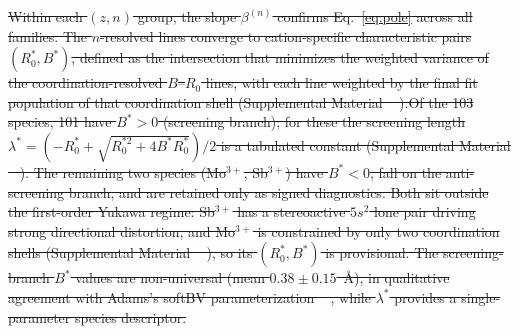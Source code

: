 \documentclass[aps,prmaterials,twocolumn,10pt,superscriptaddress,floatfix]{revtex4-2} %
\providecommand{\DIFdeltex}[1]{{\protect\color{red}\sout{#1}}}                      %
\providecommand{\DIFdelbegin}{} %
\providecommand{\DIFdel}[1]{\texorpdfstring{\DIFdeltex{#1}}{}} %
\newcommand{\DIFscaledelfig}{0.5}
\newlength{\DIFdelgraphicswidth} %
\newlength{\DIFdelgraphicsheight} %
\newcommand{\DIFdelincludegraphics}[2][]{%
\sbox{\DIFdelgraphicsbox}{\DIFOincludegraphics[#1]{#2}}%
\settoboxwidth{\DIFdelgraphicswidth}{\DIFdelgraphicsbox} %
\settoboxtotalheight{\DIFdelgraphicsheight}{\DIFdelgraphicsbox} %
\scalebox{\DIFscaledelfig}{%
\parbox[b]{\DIFdelgraphicswidth}{\usebox{\DIFdelgraphicsbox}\\[-\baselineskip] \rule{\DIFdelgraphicswidth}{0em}}\llap{\resizebox{\DIFdelgraphicswidth}{\DIFdelgraphicsheight}{%
\setlength{\unitlength}{\DIFdelgraphicswidth}%
\begin{picture}(1,1)%
\thicklines\linethickness{2pt} %
{\color[rgb]{1,0,0}\put(0,0){\framebox(1,1){}}}%
{\color[rgb]{1,0,0}\put(0,0){\line( 1,1){1}}}%
{\color[rgb]{1,0,0}\put(0,1){\line(1,-1){1}}}%
\end{picture}%
}\hspace*{3pt}}} %
} %
\DeclareRobustCommand{\DIFdelbegin}{\DIFOdelbegin \let\includegraphics\DIFdelincludegraphics} %
\begin{document}
\DIFdelbegin \DIFdel{Within each $(z,n)$ group, the slope $\beta^{(n)}$ confirms
Eq.~\eqref{eq:pole} across all families.  The $n$-resolved lines
converge to cation-specific characteristic pairs
$(R_0^*,B^*)$, defined as the intersection that minimizes
the weighted variance of the coordination-resolved $B$--$R_0$ lines,
with each line weighted by the final fit population of that
coordination shell (Supplemental Material \mbox{%
\cite{suppmat}}\hskip0pt%
).Of the 103 species, 101 have $B^*>0$ (screening branch);
for these the screening length
$\lambda^*=(-R_0^*+\sqrt{R_0^{*2}+4B^*R_0^*})/2$ is a tabulated
constant (Supplemental Material \mbox{%
\cite{suppmat}}\hskip0pt%
).  The remaining two
species (Mo$^{3+}$, Sb$^{3+}$) have $B^*<0$, fall on the anti-screening branch, and are
retained only as signed diagnostics.  Both sit outside the first-order
Yukawa regime: Sb$^{3+}$ has a stereoactive $5s^2$ lone pair driving
strong directional distortion, and Mo$^{3+}$ is constrained by
only two
coordination shells (Supplemental Material \mbox{%
\cite{suppmat}}\hskip0pt%
), so its
$(R_0^*,B^*)$ is provisional.  The screening-branch $B^*$ values are non-universal
(mean $0.38\pm0.15$~\AA), in qualitative agreement with Adams's softBV
parameterization \mbox{%
\cite{Adams2001}}\hskip0pt%
, while $\lambda^*$ provides a
single-parameter species descriptor.
}%
\end{document}
